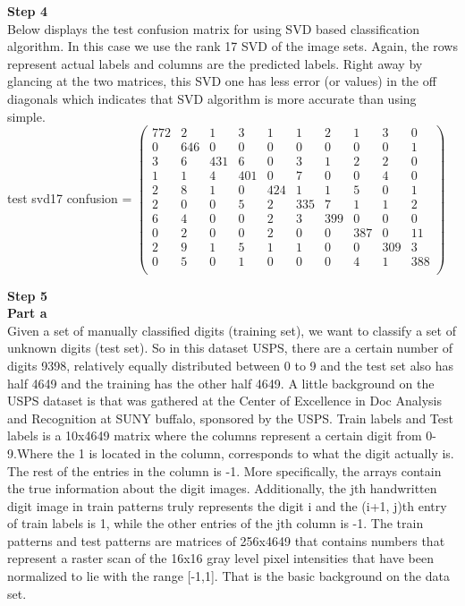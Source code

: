 \documentclass{article}
\begin{document}
\textbf{Step 4} \\ 
Below displays the test confusion matrix for using SVD based classification algorithm. In this case we use the rank 17 SVD of the image sets. Again, the rows represent actual labels and columns are the predicted labels. Right away by glancing at the two matrices, this SVD one has less error (or values) in the off diagonals which indicates that SVD algorithm is more accurate than using simple. \\ 
\bigskip
test svd17 confusion =
$
 \begin{pmatrix}
772 &   2   & 1  &  3   & 1   & 1   & 2   & 1 &   3 &   0 \\
0  &  646 &   0   & 0   & 0  &  0   & 0  &  0   & 0  &  1\\
3  &  6  &  431  &  6&    0&    3&    1  &  2  &  2 &   0\\
1  &  1&    4  &  401  &  0 &   7 &   0 &   0   & 4    &0\\
2  &  8  &  1 &   0  &  424  &  1  &  1 &   5 &   0   & 1\\
2  &  0 &   0   & 5   & 2   & 335   & 7   & 1 &   1  &  2\\
6 &   4  &  0  &  0 &   2&    3   & 399  &  0  &  0   & 0\\
0 &   2  &  0   & 0   & 2  &  0  &  0   & 387    &0   & 11\\
2 &   9 &   1   & 5   & 1   & 1  &  0  &  0   & 309 &   3\\
0  &  5 &   0&    1    &0   & 0  &  0   & 4 &   1 &   388 \\
\end{pmatrix} $
\\


\bigskip
\bigskip

\textbf{Step 5} \\ 
\bigskip
\textbf{Part a} \\ 
Given a set of manually classified digits (training set), we want to classify a set of unknown digits (test set). So in this dataset USPS, there are a certain number of digits 9398, relatively equally distributed between 0 to 9 and the test set also has half 4649 and the training has the other half 4649. A little background on the USPS dataset is that was gathered at the Center of Excellence in Doc Analysis and Recognition at SUNY buffalo, sponsored by the USPS. Train labels and Test labels is a 10x4649 matrix where the columns represent a certain digit from 0-9.Where the 1 is located in the column, corresponds to what the digit actually is. The rest of the entries in the column is -1. More specifically, the arrays contain the true information about the digit images. Additionally, the jth handwritten digit image in train patterns truly represents the digit i and the (i+1, j)th entry of train labels is 1, while the other entries of the jth column is -1. The train patterns and test patterns are matrices of 256x4649 that contains numbers that represent a raster scan of the 16x16 gray level pixel intensities that have been normalized to lie with the range [-1,1]. That is the basic background on the data set. \\
\end{document}
